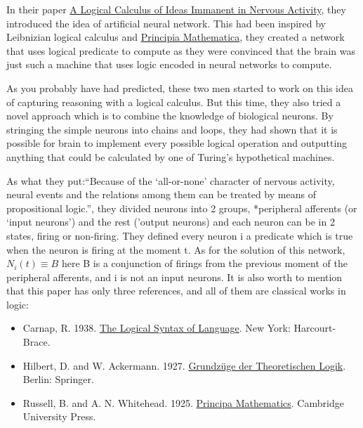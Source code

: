 \documentclass[]{book}
\theoremstyle{definition}
\theoremstyle{definition}
\theoremstyle{definition}
\theoremstyle{remark}
\begin{document}
In their paper
\href{http://www.cs.cmu.edu/~epxing/Class/10715/reading/McCulloch.and.Pitts.pdf}{A
Logical Calculus of Ideas Immanent in Nervous Activity}, they introduced
the idea of artificial neural network. This had been inspired by
Leibnizian logical calculus and
\href{https://en.wikipedia.org/wiki/Principia_Mathematica}{Principia
Mathematica}, they created a network that uses logical predicate to
compute as they were convinced that the brain was just such a machine
that uses logic encoded in neural networks to compute.

As you probably have had predicted, these two men started to work on
this idea of capturing reasoning with a logical calculus. But this time,
they also tried a novel approach which is to combine the knowledge of
biological neurons. By stringing the simple neurons into chains and
loops, they had shown that it is possible for brain to implement every
possible logical operation and outputting anything that could be
calculated by one of Turing's hypothetical machines.

As what they put:``Because of the `all-or-none' character of nervous
activity, neural events and the relations among them can be treated by
means of propositional logic.'', they divided neurons into 2 groups,
*peripheral afferents (or `input neurons') and the rest ('output
neurons) and each neuron can be in 2 states, firing or non-firing. They
defined every neuron i a predicate which is true when the neuron is
firing at the moment t. As for the solution of this network,
\(N_i(t) \equiv B\) here B is a conjunction of firings from the previous
moment of the peripheral afferents, and i is not an input neurons. It is
also worth to mention that this paper has only three references, and all
of them are classical works in logic:

\begin{itemize}
\item
  Carnap, R. 1938.
  \href{https://archive.org/details/in.ernet.dli.2015.136409/page/n5}{The
  Logical Syntax of Language}. New York: Harcourt-Brace.
\item
  Hilbert, D. and W. Ackermann. 1927.
  \href{https://www.springer.com/us/book/9783642654015}{Grundzüge der
  Theoretischen Logik}. Berlin: Springer.
\item
  Russell, B. and A. N. Whitehead. 1925.
  \href{https://en.wikipedia.org/wiki/The_Principles_of_Mathematics}{Principa
  Mathematics}. Cambridge University Press.
\end{itemize}
\end{document}
